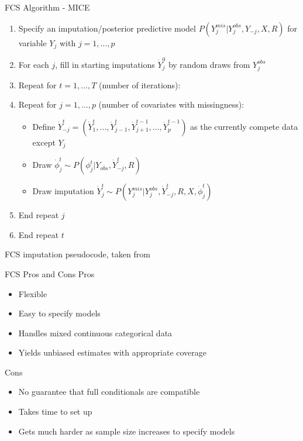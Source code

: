 \begin{frame}{FCS Algorithm - MICE}
 
 \begin{enumerate}
\item Specify an imputation/posterior predictive model $P(Y_{j}^{mis}|Y_{j}^{obs},Y_{-j},X,R)$ for variable $Y_j$ with $j=1,\dots,p$
\item For each $j$, fill in starting imputations $\dot{Y}_j ^{0}$ by random draws from $Y_{j}^{obs}$
\item Repeat for $t=1,\dots, T$ (number of iterations):
\item Repeat for $j=1,\dots,p$ (number of covariates with missingness):
\begin{itemize}
\item Define $\dot{Y}_{-j}^{t}=(\dot{Y}_1^{t},\dots,\dot{Y}_{j-1}^{t},\dot{Y}_{j+1}^{t-1},\dots,\dot{Y}_p^{t-1})$
as the currently compete data except $Y_j$
\item Draw $\dot{\phi}_j^{t}\sim P(\phi_j^t|Y_{obs},\dot{Y}_{-j}^{t},R)$
\item Draw imputation $\dot{Y}_{j}^{t}\sim P(Y_j^{mis}|Y_j^{obs},\dot{Y}_{-j}^{t},R,X,\dot{\phi}_j^{t})$
\end{itemize}
\item End repeat $j$
\item End repeat $t$
\end{enumerate}
FCS imputation pseudocode, taken from \cite{VanBuuren2012}
\end{frame}

\begin{frame}{FCS Pros and Cons}
Pros
 \begin{itemize}
  \item Flexible
  \item Easy to specify models
  \item Handles mixed continuous categorical data
  \item Yields unbiased estimates with appropriate coverage
 \end{itemize}

 Cons
 \begin{itemize}
  \item No guarantee that full conditionals are compatible
  \item Takes time to set up
  \item Gets much harder as sample size increases to specify models
 \end{itemize}

\end{frame}


